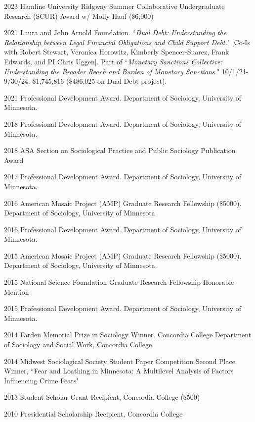 \documentclass[letterpaper]{article}
\renewenvironment{itemize}{
  \begin{list}{}{
    \setlength{\leftmargin}{1.5em}
  }
}{
  \end{list}
}
\begin{document}
\begin{itemize}

\item 2023 Hamline University Ridgway Summer Collaborative Undergraduate Research (SCUR) Award w/ Molly Hauf (\$6,000)
\item 2021  Laura and John Arnold Foundation. ``\textit{Dual Debt: Understanding the Relationship between Legal Financial Obligations and Child Support Debt.}" [Co-Is with Robert Stewart, Veronica Horowitz, Kimberly Spencer-Suarez, Frank Edwards, and PI Chris Uggen]. Part of ``\textit{Monetary Sanctions Collective: Understanding the Broader Reach and Burden of Monetary Sanctions.}" 10/1/21-9/30/24. \$1,745,816 (\$486,025 on Dual Debt project).
\item 2021 Professional Development Award. Department of Sociology, University of Minnesota. 
\item 2018 Professional Development Award. Department of Sociology, University of Minnesota. 
\item 2018 ASA Section on Sociological Practice and Public Sociology Publication Award
\item 2017 Professional Development Award. Department of Sociology, University of Minnesota. 
\item 2016 American Mosaic Project (AMP) Graduate Research Fellowship (\$5000). Department of Sociology, University of Minnesota
\item 2016 Professional Development Award. Department of Sociology, University of Minnesota. 
\item 2015 American Mosaic Project (AMP) Graduate Research Fellowship (\$5000). Department of Sociology, University of Minnesota. 
\item 2015 National Science Foundation Graduate Research Fellowship Honorable Mention
\item 2015 Professional Development Award. Department of Sociology, University of Minnesota. 
\item 2014 Farden Memorial Prize in Sociology Winner. Concordia College Department of Sociology and Social Work, Concordia College
\item 2014 Midwest Sociological Society Student Paper Competition Second Place Winner,  ``Fear and Loathing in Minnesota: A Multilevel Analysis of Factors Influencing Crime Fears"
\item 2013 Student Scholar Grant Recipient, Concordia College (\$500)
\item 2010 Presidential Scholarship Recipient, Concordia College

\end{itemize}
\end{document}
